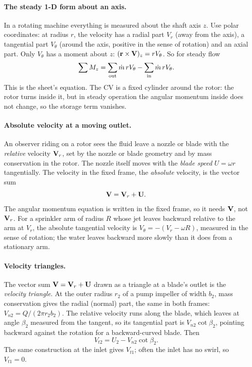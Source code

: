 \paragraph{The steady 1-D form about an axis.} In a rotating machine everything is measured about the shaft axis $z$. Use polar coordinates: at radius $r$, the velocity has a radial part $V_r$ (away from the axis), a tangential part $V_\theta$ (around the axis, positive in the sense of rotation) and an axial part. Only $V_\theta$ has a moment about $z$: $(\mathbf{r}\times\mathbf{V})_z = rV_\theta$. So for steady flow
\[
\sum M_z = \sum_\text{out}\dot m\,rV_\theta - \sum_\text{in}\dot m\,rV_\theta .
\]
This is the sheet's equation. The CV is a fixed cylinder around the rotor: the rotor turns inside it, but in steady operation the angular momentum inside does not change, so the storage term vanishes.

\paragraph{Absolute velocity at a moving outlet.} An observer riding on a rotor sees the fluid leave a nozzle or blade with the \emph{relative} velocity $\mathbf{V}_r$, set by the nozzle or blade geometry and by mass conservation in the rotor. The nozzle itself moves with the \emph{blade speed} $U = \omega r$ tangentially. The velocity in the fixed frame, the \emph{absolute} velocity, is the vector sum
\[
\mathbf{V} = \mathbf{V}_r + \mathbf{U} .
\]
The angular momentum equation is written in the fixed frame, so it needs $\mathbf{V}$, not $\mathbf{V}_r$. For a sprinkler arm of radius $R$ whose jet leaves backward relative to the arm at $V_r$, the absolute tangential velocity is $V_\theta = -(V_r - \omega R)$, measured in the sense of rotation; the water leaves backward more slowly than it does from a stationary arm.

\paragraph{Velocity triangles.} The vector sum $\mathbf{V} = \mathbf{V}_r + \mathbf{U}$ drawn as a triangle at a blade's outlet is the \emph{velocity triangle}. At the outer radius $r_2$ of a pump impeller of width $b_2$, mass conservation gives the radial (normal) part, the same in both frames: $V_{n2} = Q/(2\pi r_2b_2)$. The relative velocity runs along the blade, which leaves at angle $\beta_2$ measured from the tangent, so its tangential part is $V_{n2}\cot\beta_2$, pointing backward against the rotation for a backward-curved blade. Then
\[
V_{t2} = U_2 - V_{n2}\cot\beta_2 .
\]
The same construction at the inlet gives $V_{t1}$; often the inlet has no swirl, so $V_{t1} = 0$.


